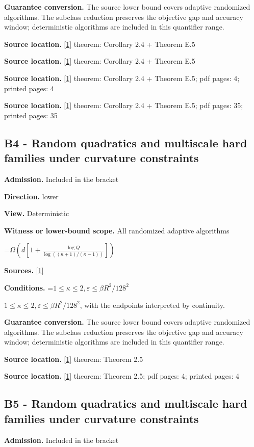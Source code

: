 \documentclass[10pt,a4paper]{article}
\newcommand{\AtlasMath}[1]{\par\begingroup\centering\setbox0=\hbox{$\displaystyle #1$}\ifdim\wd0>1.4\linewidth\typeout{ATLAS WIDE FORMULA: \the\wd0}\fi\ifdim\wd0>\linewidth\resizebox{\linewidth}{!}{\box0}\else\box0\fi\par\endgroup}
\newcommand{\AtlasInlineMath}[1]{\begingroup\setbox0=\hbox{$#1$}\ifdim\wd0>.4\linewidth\endgroup\AtlasMath{#1}\else\endgroup$#1$\fi}
\begin{document}
\textbf{Guarantee conversion.} The source lower bound covers adaptive randomized algorithms. The subclass reduction preserves the objective gap and accuracy window; deterministic algorithms are included in this quantifier range.

\textbf{Source location.} \href{https://arxiv.org/html/2610.00345v1}{[1]} theorem: Corollary 2.4 + Theorem E.5

\textbf{Source location.} \href{https://arxiv.org/html/2610.00345v1}{[1]} theorem: Corollary 2.4 + Theorem E.5

\textbf{Source location.} \href{https://arxiv.org/html/2610.00345v1}{[1]} theorem: Corollary 2.4 + Theorem E.5; pdf pages: 4; printed pages: 4

\textbf{Source location.} \href{https://arxiv.org/html/2610.00345v1}{[1]} theorem: Corollary 2.4 + Theorem E.5; pdf pages: 35; printed pages: 35

\subsection{B4 - Random quadratics and multiscale hard families under curvature constraints}
\textbf{Admission.} Included in the bracket

\textbf{Direction.} lower

\textbf{View.} Deterministic

\textbf{Witness or lower-bound scope.} All randomized adaptive algorithms

\AtlasMath{\Omega\!\left(d\left[1+\frac{\log Q}{\log((\kappa+1)/(\kappa-1))}\right]\right)}
\textbf{Sources.} \href{https://arxiv.org/html/2610.00345v1}{[1]}

\textbf{Conditions.} \AtlasInlineMath{1\le\kappa\le2,\varepsilon\le \beta R^2/128^2}, with the endpoints interpreted by continuity.

\textbf{Guarantee conversion.} The source lower bound covers adaptive randomized algorithms. The subclass reduction preserves the objective gap and accuracy window; deterministic algorithms are included in this quantifier range.

\textbf{Source location.} \href{https://arxiv.org/html/2610.00345v1}{[1]} theorem: Theorem 2.5

\textbf{Source location.} \href{https://arxiv.org/html/2610.00345v1}{[1]} theorem: Theorem 2.5; pdf pages: 4; printed pages: 4

\subsection{B5 - Random quadratics and multiscale hard families under curvature constraints}
\textbf{Admission.} Included in the bracket
\end{document}
